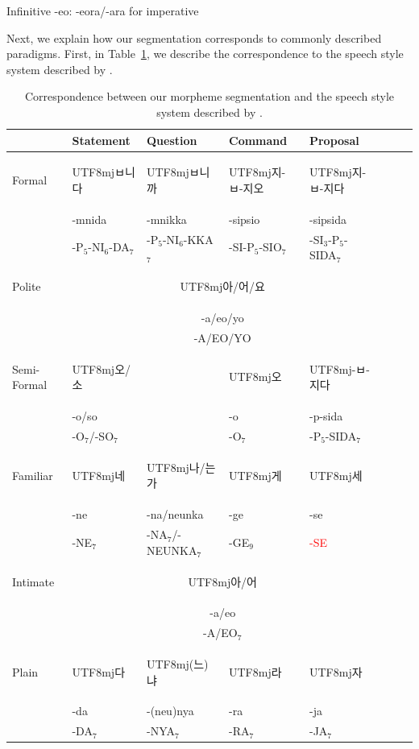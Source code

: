 \documentclass[11pt,letterpaper]{article}
\newcommand{\korean}[1]{\begin{CJK}{UTF8}{mj}#1\end{CJK}}
\begin{document}
Infinitive -eo: -eora/-ara for imperative \citep[4.3.6.4]{yeon2010korean}


Next, we explain how our segmentation corresponds to commonly described paradigms.
First, in Table~\ref{tab:korean-styles}, we describe the correspondence to the speech style system described by \citep[4.3.2]{yeon2010korean}.



\begin{table}
\begin{tabular}{l||l|l|l|llll}
            & Statement & Question  & Command    & Proposal    \\ \hline\hline
Formal      &  \korean{ㅂ니다} & \korean{ㅂ니까} & \korean{지-ㅂ-지오} & \korean{지-ㅂ-지다} \\ 
      &  -mnida & -mnikka  & -sipsio & -sipsida  \\ 
      &  -P$_5$-NI$_6$-DA$_7$ & -P$_5$-NI$_6$-KKA$_7$  & -SI-P$_5$-SIO$_7$ & -SI$_3$-P$_5$-SIDA$_7$ \\ \hline
Polite      &  \multicolumn{4}{c}{\korean{아/어/요}}  \\
      &  \multicolumn{4}{c}{-a/eo/yo}  \\
            & \multicolumn{4}{c}{-A/EO/YO} \\ \hline
Semi-Formal & \korean{오/소}   &           &   \korean{오}       &  \korean{-ㅂ-지다} \\
&  -o/so   &           & -o        & -p-sida \\
 &  -O$_7$/-SO$_7$   &           & -O$_7$    & -P$_5$-SIDA$_7$ \\\hline
Familiar    &    \korean{네}    &  \korean{나/는가} &  \korean{게}      &    \korean{세} \\
            & -ne                  & -na/neunka & -ge & -se \\ 
            & -NE$_7$                  & -NA$_7$/-NEUNKA$_7$ & -GE$_9$ & \textcolor{red}{-SE} \\ \hline
Intimate      &  \multicolumn{4}{c}{\korean{아/어}}  \\
      &  \multicolumn{4}{c}{-a/eo}  \\
            & \multicolumn{4}{c}{-A/EO$_7$} \\ \hline
Plain       &   \korean{다}     &  \korean{(느)냐} &  \korean{라}     &  \korean{자}\\
            &  -da    &  -(neu)nya & -ra      & -ja \\
            & -DA$_7$    &   -NYA$_7$          & -RA$_7$      & -JA$_7$\\
\end{tabular}
\caption{Correspondence between our morpheme segmentation and the speech style system described by \citep[4.3.2]{yeon2010korean}.}\label{tab:korean-styles}
\end{table}
\end{document}
